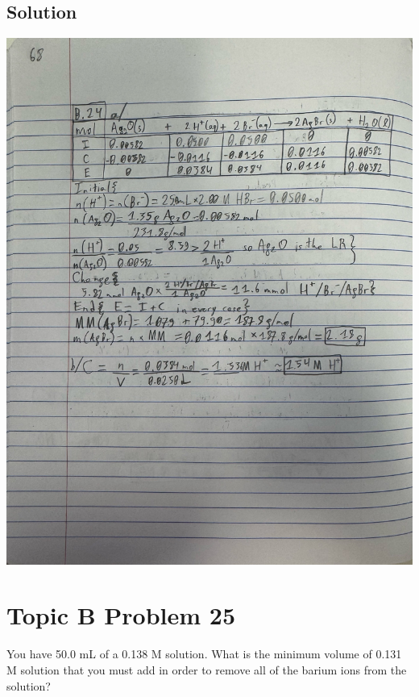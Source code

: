 \documentclass[10pt]{article}
\begin{document}
        \subsection{Solution}
            \begin{center}
                \includegraphics[width=\textwidth, trim={5in 15in 1in 6in},clip]{"Answers Images/IMG_6654.jpg"}
            \end{center}

    \pagebreak
    \section{Topic B Problem 25}
        You have 50.0 mL of a 0.138 M  solution. 
        What is the minimum volume of 0.131 M  solution that you must add in order to remove all of the barium ions from the solution?
\end{document}
